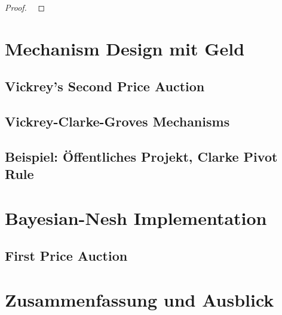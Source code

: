 \documentclass[a4paper,11pt]{article}
\theoremstyle{definition}
\theoremstyle{plain}
\theoremstyle{definition}
\begin{document}
\begin{proof}
	~\cite{fey14}
\end{proof}

\section{Mechanism Design mit Geld}
\subsection{Vickrey's Second Price Auction}
\subsection{Vickrey-Clarke-Groves Mechanisms}
\subsection{Beispiel: Öffentliches Projekt, Clarke Pivot Rule}

\section{Bayesian-Nesh Implementation}
\subsection{First Price Auction}

\section{Zusammenfassung und Ausblick}
~\cite{lov21}



\end{document}
